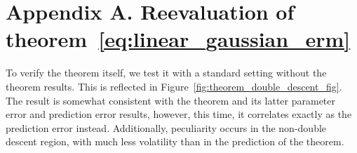 \documentclass[10pt]{article} %
\begin{document}



\clearpage

\appendix
\section*{Appendix A. Reevaluation of theorem~\ref{eq:linear_gaussian_erm}}

To verify the theorem itself, we test it with a standard setting without the theorem results. This is reflected in Figure~\ref{fig:theorem_double_descent_fig}. The result is somewhat consistent with the theorem and its latter parameter error and prediction error results, however, this time, it correlates exactly as the prediction error instead. Additionally, peculiarity occurs in the non-double descent region, with much less volatility than in the prediction of the theorem. 
\end{document}

